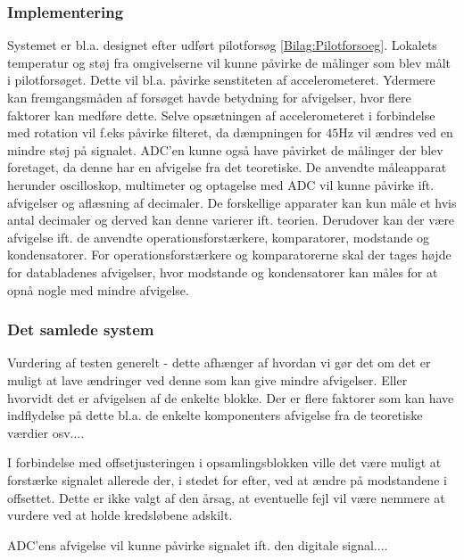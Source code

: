 \subsubsection{Implementering}
Systemet er bl.a. designet efter udført pilotforsøg \ref{Bilag:Pilotforsoeg}. Lokalets temperatur og støj fra omgivelserne vil kunne påvirke de målinger som blev målt i pilotforsøget. Dette vil bl.a. påvirke senstiteten af accelerometeret. Ydermere kan fremgangsmåden af forsøget havde betydning for afvigelser, hvor flere faktorer kan medføre dette. Selve opsætningen af accelerometeret i forbindelse med rotation vil f.eks påvirke filteret, da dæmpningen for $45$Hz vil ændres ved en mindre støj på signalet. ADC'en kunne også have påvirket de målinger der blev foretaget, da denne har en afvigelse fra det teoretiske. 
De anvendte måleapparat herunder oscilloskop, multimeter og optagelse med ADC vil kunne påvirke ift. afvigelser og aflæsning af decimaler. De forskellige apparater kan kun måle et hvis antal decimaler og derved kan denne varierer ift. teorien. Derudover kan der være afvigelse ift. de anvendte operationsforstærkere, komparatorer, modstande og kondensatorer. For operationsforstærkere og komparatorerne skal der tages højde for databladenes afvigelser, hvor modstande og kondensatorer kan måles for at opnå nogle med mindre afvigelse.
 
\subsubsection{Det samlede system}
Vurdering af testen generelt - dette afhænger af hvordan vi gør det om det er muligt at lave ændringer ved denne som kan give mindre afvigelser. Eller hvorvidt det er afvigelsen af de enkelte blokke. Der er flere faktorer som kan have indflydelse på dette bl.a. de enkelte komponenters afvigelse fra de teoretiske værdier osv....

I forbindelse med offsetjusteringen i opsamlingsblokken ville det være muligt at forstærke signalet allerede der, i stedet for efter, ved at ændre på modstandene i offsettet. Dette er ikke valgt af den årsag, at eventuelle fejl vil være nemmere at vurdere ved at holde kredsløbene adskilt.

ADC'ens afvigelse vil kunne påvirke signalet ift. den digitale signal....